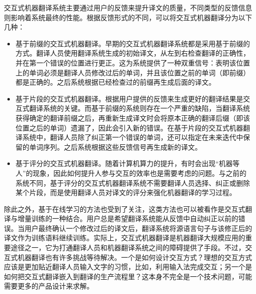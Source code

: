 \parinterval 交互式机器翻译系统主要通过用户的反馈来提升译文的质量，不同类型的反馈信息则影响着系统最终的性能。根据反馈形式的不同，可以将交互式机器翻译分为以下几种：
\begin{itemize}
\vspace{0.5em}
\item 基于前缀的交互式机器翻译。早期的交互式机器翻译系统都是采用基于前缀的方式。翻译人员使用翻译系统生成的初始译文，从左到右检查翻译的正确性，并在第一个错误的位置进行更正。这为系统提供了一种双重信号：表明该位置上的单词必须是翻译人员修改过后的单词，并且该位置之前的单词（即前缀）都是正确的。之后系统根据已经检查过的前缀再生成后面的译文。

\vspace{0.5em}
\item 基于片段的交互式机器翻译。根据用户提供的反馈来生成更好的翻译结果是交互式翻译系统的关键。而基于前缀的系统则存在一个严重的缺陷，当翻译系统获得确定的翻译前缀之后，再重新生成译文时会将原本正确的翻译后缀（即该位置之后的单词）遗漏了，因此会引入新的错误。在基于片段的交互式机器翻译系统中，翻译人员除了纠正第一个错误的单词，还可以指定在未来迭代中保留的单词序列。之后系统根据这些反馈信号再生成新的译文。

\vspace{0.5em}
\item 基于评分的交互式机器翻译。随着计算机算力的提升，有时会出现“机器等人”的现象，因此如何提升人参与交互的效率也是需要考虑的问题。与之前的系统不同，基于评分的交互式机器翻译系统不需要翻译人员选择、纠正或删除某个片段，而是使用翻译人员对译文的评分来强化机器翻译的学习过程。

\vspace{0.5em}
\end{itemize}

\parinterval 除此之外，基于在线学习的方法也受到了关注，这类方法也可以被看作是交互式翻译与增量训练的一种结合。用户总是希望翻译系统能从反馈中自动纠正以前的错误。当用户最终确认一个修改过后的译文后，翻译系统将源语言句子与该修正后的译文作为训练语料继续训练。实际上，交互式机器翻译是机器翻译大规模应用的重要途径之一，它为打通翻译人员和机器翻译系统之间的障碍提供了手段。不过，交互式机器翻译也有许多挑战等待解决。一个是如何设计交互方式？理想的交互方式应该是更加贴近翻译人员输入文字的习惯，比如，利用输入法完成交互；另一个是如何把交互式翻译嵌入到翻译的生产流程里？这本身不完全是一个技术问题，可能需要更多的产品设计来求解。


